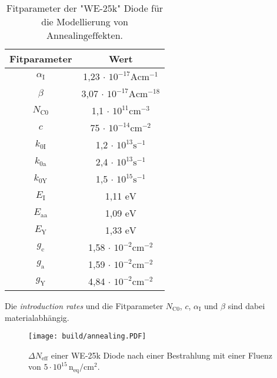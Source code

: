 \begin{table}
  \centering
  \caption{Fitparameter der "WE-25k" Diode für die Modellierung von ${\mathrm{Annealingeffekten}}$. }
  \label{tab:w1}
  \begin{tabular}{c c}
    \toprule
    Fitparameter & Wert  \\
    \midrule
        $\alpha_{\mathrm{I}}$  &    1,23 $\cdot$ $  10^{-17}        \mathrm{Acm^{-1}}$    \\
        $\beta $               &    3,07 $\cdot$ $10^{-17}          \mathrm{Acm^{-18}}$     \\
        $N_{\mathrm{C0}}$             &    1,1  $\cdot$            $10^{11}\mathrm{cm^{-3}}$   \\
        $c$                          &    75   $\cdot$             $10^{-14}\mathrm{cm^{-2}}$    \\
        $k_{0\mathrm{I}}$            &    1,2  $\cdot$             $10^{13}\mathrm{s^{-1}}$\\
        $k_{0\mathrm{a}}$           &    2,4  $\cdot$              $10^{13}\mathrm{s^{-1}}$   \\
        $k_{0\mathrm{Y}}$            &    1,5  $\cdot$             $10^{15}\mathrm{s^{-1}}$     \\
        $E_{\mathrm{I}}$                       &    1,11           $\mathrm{eV}$       \\
        $E_{\mathrm{aa}}$                     &    1,09            $\mathrm{eV}$       \\
        $E_{\mathrm{Y}}$                      &    1,33            $\mathrm{eV}$    \\
        $g_{\mathrm{c}}$      &    1,58 $\cdot$                    $10^{-2}\mathrm{cm^{-2}}$           \\
        $g_{\mathrm{a}}$           &    1,59 $\cdot$               $10^{-2}\mathrm{cm^{-2}}$         \\
        $g_{\mathrm{Y}}$          &    4,84 $\cdot$                $10^{-2}\mathrm{cm^{-2}}$      \\
    \bottomrule
  \end{tabular}
\end{table}
Die \textit{introduction rates} und die Fitparameter $N_{\mathrm{C0}}$, $c$, $\alpha_{\mathrm{I}}$ und $\beta $ sind dabei materialabhängig.

\begin{figure}
  \centering
    \texttt{[image: build/annealing.PDF]}
    \caption{$\Delta N_{\mathrm{eff}}$ einer WE-25k Diode nach einer Bestrahlung mit einer Fluenz von
    $5\cdot 10^{15} \, \mathrm{n_{\mathrm{eq}}/cm^2}$.}
    \label{fig:N_eff}
\end{figure}

